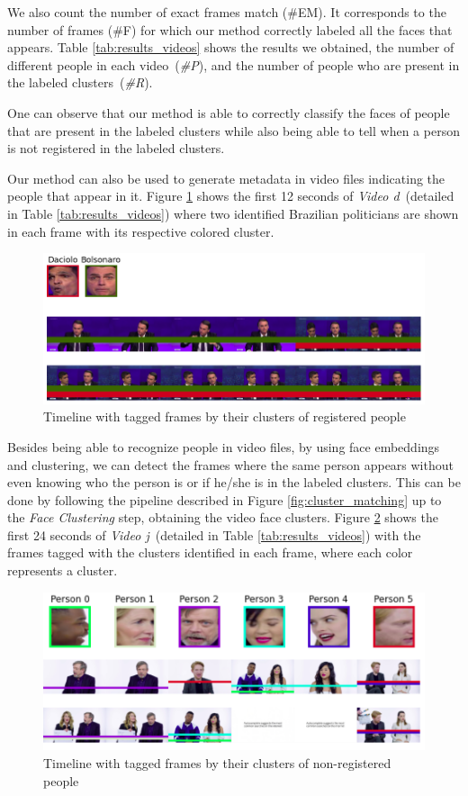 We also count the number of exact frames match (\#EM). It corresponds to the number of frames (\#F) for which our method correctly labeled all the faces that appears. 
Table \ref{tab:results_videos} shows the results we obtained, the number of different people in each video~(\emph{\#P}), and the number of people who are present in the labeled clusters~(\emph{\#R}).

One can observe that our method is able to correctly classify the faces of people that are present in the labeled clusters while also being able to tell when a person is not registered in the labeled clusters.

Our method can also be used to generate metadata in video files indicating the people that appear in it.
Figure \ref{fig:timeline_pol} shows the first 12 seconds of \emph{Video d}~(detailed in Table \ref{tab:results_videos}) where two identified Brazilian politicians are shown in each frame with its respective colored cluster.

\begin{figure}[!ht]
    \centering
    \includegraphics[width=0.6\linewidth]{img/webmedia/timeline_pol.png}
\vspace{-1em}
    \caption{Timeline with tagged frames by their clusters of registered people}
    \label{fig:timeline_pol}
\end{figure}

Besides being able to recognize people in video files, by using face embeddings and clustering, we can detect the frames where the same person appears without even knowing who the person is or if he/she is in the labeled clusters.
This can be done by following the pipeline described in Figure \ref{fig:cluster_matching} up to the \emph{Face Clustering} step, obtaining the video face clusters.
Figure \ref{fig:timeline} shows the first 24 seconds of \emph{Video j}~(detailed in Table \ref{tab:results_videos}) with the frames tagged with the clusters identified in each frame, where each color represents a cluster.

\begin{figure}[!ht]
    \centering
    \includegraphics[width=0.6\linewidth]{img/webmedia/timeline2.png}
    \caption{Timeline with tagged frames by their clusters of non-registered people}
    \label{fig:timeline}
\end{figure}